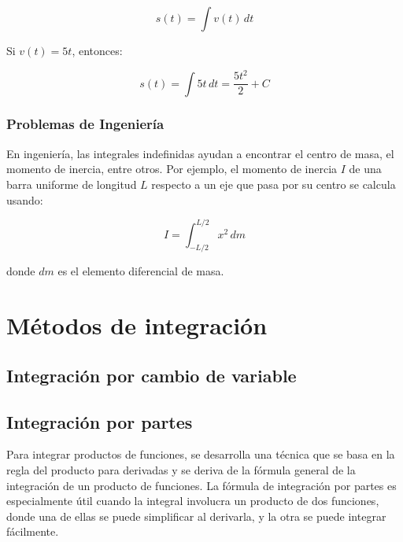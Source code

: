 \[
s(t) = \int v(t) \, dt
\]

Si \( v(t) = 5t \), entonces:

\[
s(t) = \int 5t \, dt = \frac{5t^2}{2} + C
\]

\subsubsection{Problemas de Ingeniería}

En ingeniería, las integrales indefinidas ayudan a encontrar el centro de masa, el momento de inercia, entre otros. Por ejemplo, el momento de inercia \( I \) de una barra uniforme de longitud \( L \) respecto a un eje que pasa por su centro se calcula usando:

\[
I = \int_{-L/2}^{L/2} x^2 \, dm
\]

donde \( dm \) es el elemento diferencial de masa.

\newpage

\section{Métodos de integración} %
\newpage
\subsection{Integración por cambio de variable}
\newpage
\subsection{Integración por partes}
Para integrar productos de funciones, se desarrolla una técnica que se basa en la regla del producto para derivadas y se deriva de la fórmula general de la integración de un producto de funciones. La fórmula de integración por partes es especialmente útil cuando la integral involucra un producto de dos funciones, donde una de ellas se puede simplificar al derivarla, y la otra se puede integrar fácilmente.

